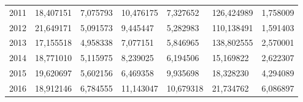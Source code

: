 \begin{table}
\begin{tabular}{p{1cm}p{2cm}p{2cm}p{2cm}p{2cm}p{2cm}p{2cm}}
 2011 &                              18,407151 &     7,075793 &            10,476175 &                       7,327652 &  126,424989 &                        1,758009 \\
 2012 &                              21,649171 &     5,091573 &             9,445447 &                       5,282983 &  110,138491 &                        1,591403 \\
 2013 &                              17,155518 &     4,958338 &             7,077151 &                       5,846965 &  138,802555 &                        2,570001 \\
 2014 &                              18,771010 &     5,115975 &             8,239025 &                       6,194506 &   15,169822 &                        2,622307 \\
 2015 &                              19,620697 &     5,602156 &             6,469358 &                       9,935698 &   18,328230 &                        4,294089 \\
 2016 &                              18,912146 &     6,784555 &            11,143047 &                      10,679318 &   21,734762 &                        6,086897 \\
\bottomrule
\end{tabular}
\end{table}

